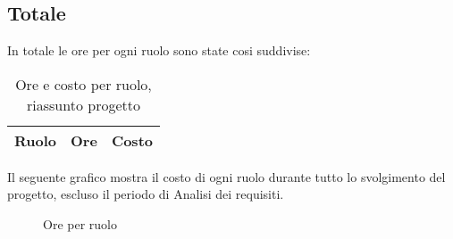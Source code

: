 \subsection{Totale}

In totale le ore per ogni ruolo sono state cosi suddivise:

\begin{table}[H]
	\centering
	\begin{tabular}{ l c c }
	\textbf{Ruolo} & \textbf{Ore} & \textbf{Costo} \\
	\hline
	
		
	
	\end{tabular}
	\caption{Ore e costo per ruolo, riassunto progetto}
	\end{table}

Il seguente grafico mostra il costo di ogni ruolo durante tutto lo svolgimento del progetto, escluso il periodo di Analisi dei requisiti.

\begin{figure}[H]
\begin{tikzpicture}

	

\end{tikzpicture}
\caption{Ore per ruolo}
\end{figure}